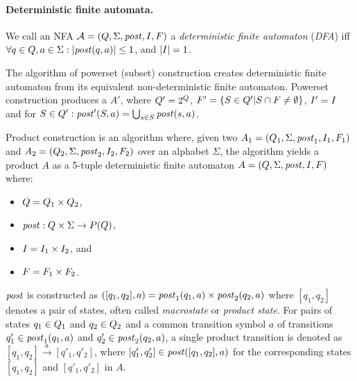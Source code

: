
\paragraph{Deterministic finite automata.}
We call an NFA $\mathcal{A} = (Q, \Sigma
, \mathit{post}, I, F)$ a \emph{deterministic finite automaton} (\emph{DFA}) iff $\forall q \in Q, a \in \Sigma: |\mathit{post}(q, a)| \leq 1
$, and $|I| = 1$.

\begin{definition} \hfill \newline
    The algorithm of powerset (subset) construction creates deterministic finite automaton from its equivalent non-deterministic finite automaton. Powerset construction produces a \dfa $A'$, where $Q' = 2^Q$, $F' = \{S \in Q' | S \cap F \neq \emptyset\}$, $I' = I$ and for $S \in Q': \mathit{post}'(S, a) = \bigcup_{s \in S} \mathit{post}(s, a)$.
\end{definition}

\begin{definition} \hfill \newline
Product construction is an algorithm where, given two \nfas $A_1 = (Q_1, \Sigma, \mathit{post}_1, I_1, F_1)$ and $A_2 = (Q_2, \Sigma, \mathit{post}_2, I_2, F_2)$ over an alphabet $\Sigma$, the algorithm yields a product \nfa $A$ as a 5-tuple deterministic finite automaton $A = (Q, \Sigma, \mathit{post}, I, F)$ where:
\begin{itemize}
    \item $Q = Q_1 \times Q_2$,
    \item $\mathit{post}: Q \times \Sigma \rightarrow{} P(Q)$,
    \item $I = I_1 \times I_2$, and
    \item $F = F_1 \times F_2$.
\end{itemize}
\end{definition}

$\mathit{post}$ is constructed as $([q_1, q_2], a) = \mathit{post}_1(q_1, a) \times \mathit{post}_2(q_2, a)$ where $[q_1, q_2]$ denotes a pair of states, often called \emph{macrostate} or \emph{product state}. For pairs of states $q_1 \in Q_1$ and $q_2 \in Q_2$ and a common transition symbol $a$ of transitions $q'_1 \in \mathit{post}_1(q_1, a)$ and $q'_2 \in \mathit{post}_2(q_2,a)$, a single product transition is denoted as $[q_1, q_2] \xrightarrow{a} [q'_1, q'_2]$, where $[q'_1, q'_2] \in \mathit{post}([q_1, q_2], a)$ for the corresponding states $[q_1, q_2]$ and $[q'_1, q'_2]$ in $A$.

